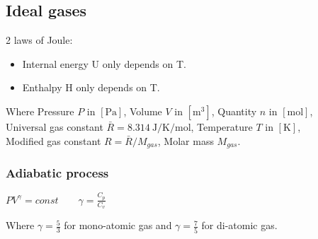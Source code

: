 \documentclass[10pt,a4paper]{scrartcl}
\begin{document}
\begin{multicols*}{3}






\subsection{Ideal gases}

2 laws of Joule:
\begin{itemize}
\item Internal energy U only depends on T.
\item Enthalpy H only depends on T.
\end{itemize}



Where Pressure $P$ in $[\si{\pascal}]$, Volume $V$ in $[\si{\meter\cubed}]$, Quantity $n$ in $[\si{\mole}]$,\\ Universal gas constant $\bar{R}=\SI{8.314}{\joule\per\kelvin\per\mole}$, Temperature $T$ in $[\si{\kelvin}]$,\\ Modified gas constant $R = \bar{R}/M_{gas}$, Molar mass $M_{gas}$.


\subsubsection{Adiabatic process}

$PV^\gamma = const\qquad\gamma=\frac{C_{p}}{C_v}$

Where $\gamma=\frac{5}{3}$ for mono-atomic gas and $\gamma=\frac{7}{5}$ for di-atomic gas.


\end{multicols*}
\end{document}
